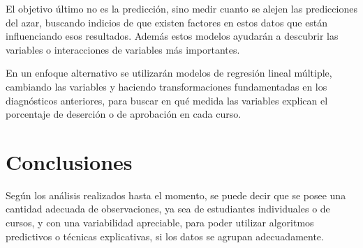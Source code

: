 \documentclass[a4paper,11pt,dvipsnames]{article}
\begin{document}
El objetivo último no es la predicción, sino medir cuanto se alejen las predicciones del azar, buscando indicios de que existen factores en estos datos que están influenciando esos resultados. Además estos modelos ayudarán a descubrir las variables o interacciones de variables más importantes.\par\medskip

En un enfoque alternativo se utilizarán modelos de regresión lineal múltiple, cambiando las variables y haciendo transformaciones fundamentadas en los diagnósticos anteriores, para buscar en qué medida las variables explican el porcentaje de deserción o de aprobación en cada curso.


\section{Conclusiones}

Según los análisis realizados hasta el momento, se puede decir que se posee una cantidad adecuada de observaciones, ya sea de estudiantes individuales o de cursos, y con una variabilidad apreciable, para poder utilizar algoritmos predictivos o técnicas explicativas, si los datos se agrupan adecuadamente.\par\medskip



\printbibliography


\end{document}
